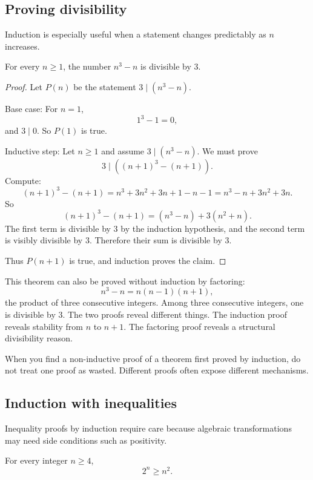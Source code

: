 \subsection{Proving divisibility}

Induction is especially useful when a statement changes predictably as $n$ increases.

\begin{theorem}
For every $n\geq1$, the number $n^3-n$ is divisible by $3$.
\end{theorem}

\begin{proof}
Let $P(n)$ be the statement $3\mid(n^3-n)$.

Base case: For $n=1$,
\[
1^3-1=0,
\]
and $3\mid0$. So $P(1)$ is true.

Inductive step: Let $n\geq1$ and assume $3\mid(n^3-n)$. We must prove
\[
3\mid((n+1)^3-(n+1)).
\]
Compute:
\[
(n+1)^3-(n+1)
=n^3+3n^2+3n+1-n-1
=n^3-n+3n^2+3n.
\]
So
\[
(n+1)^3-(n+1)=(n^3-n)+3(n^2+n).
\]
The first term is divisible by $3$ by the induction hypothesis, and the second term is visibly divisible by $3$. Therefore their sum is divisible by $3$.

Thus $P(n+1)$ is true, and induction proves the claim.
\end{proof}

This theorem can also be proved without induction by factoring:
\[
n^3-n=n(n-1)(n+1),
\]
the product of three consecutive integers. Among three consecutive integers, one is divisible by $3$. The two proofs reveal different things. The induction proof reveals stability from $n$ to $n+1$. The factoring proof reveals a structural divisibility reason.

\begin{intuitionbox}
When you find a non-inductive proof of a theorem first proved by induction, do not treat one proof as wasted. Different proofs often expose different mechanisms.
\end{intuitionbox}

\subsection{Induction with inequalities}

Inequality proofs by induction require care because algebraic transformations may need side conditions such as positivity.

\begin{theorem}
For every integer $n\geq4$,
\[
2^n\geq n^2.
\]
\end{theorem}

